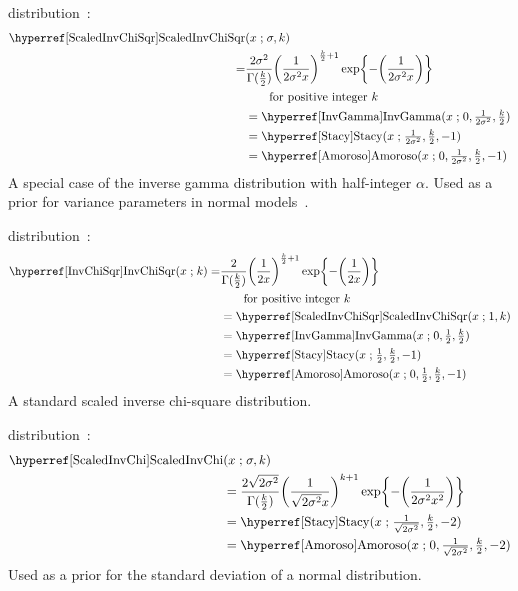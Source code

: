   distribution~\cite{Gelman2004}:
\begin{align}
\label{ScaledInvChiSqr}
\opr{ScaledInvChiSqr}&(x \given \sigma, k) 
\\ \notag =& \frac{2 \sigma^2}{\Gamma(\tfrac{k}{2}) } \Left(\frac{1}{2 \sigma^2x}\Right)^{\frac{k}{2}+1} 
\exp\Left\{-\Left( \frac{1}{2 \sigma^2x}   \Right)\Right\} \checked
\\
&\qquad  \text{for positive integer } k \notag \\
&=  \opr{InvGamma}(x\given 0, \tfrac{1}{2 \sigma^2}, \tfrac{k}{2}) \notag  \checked \\
&= \opr{Stacy}(x\given  \tfrac{1}{2 \sigma ^2},\tfrac{k}{2}, -1)  \notag  \checked \\
&=  \opr{Amoroso}(x\given  0, \tfrac{1}{2 \sigma ^2}, \tfrac{k}{2}, -1) \checked \notag 
\end{align}
A special case of the inverse gamma distribution with half-integer $\alpha$. Used as a prior for variance parameters in normal models~\cite{Gelman2004}.




 distribution~\cite{Gelman2004}: 
%
\begin{align}
\label{InvChiSqr}
\opr{InvChiSqr}(x \given k) 
=& \frac{2}{\Gamma(\tfrac{k}{2}) } \Left(\frac{1}{2x}\Right)^{\frac{k}{2}+1} \exp\Left\{-\Left( \frac{1}{2x}  \Right)\Right\}
\checked  \\
&\qquad  \text{for positive integer } k \notag \\
& = \opr{ScaledInvChiSqr}(x\given 1,k)\notag \checked \\
&=  \opr{InvGamma}(x\given 0, \tfrac{1}{2}, \tfrac{k}{2}) \notag \checked \\
&=  \opr{Stacy}(x\given \tfrac{1}{2}, \tfrac{k}{2},-1) \notag  \checked\\
&=  \opr{Amoroso}(x\given  0, \tfrac{1}{2}, \tfrac{k}{2}, -1)  \checked\notag 
\end{align}
A standard scaled inverse chi-square distribution.



 distribution~\cite{Lee2012}:
\begin{align}
\label{ScaledInvChi}
 \opr{ScaledInvChi}&(x \given \sigma, k) 
\\ \notag
&= \frac{2 \sqrt{2 \sigma ^2} }{ \Gamma(\tfrac{k}{2})} { \Left(\frac{1}{\sqrt{2 \sigma^2} x}\Right)}^{k+1} \exp\Left\{-\Left(\frac{1}{2 \sigma^2 x^2}  \Right)\Right\} \checked
\\
&=  \opr{Stacy}(x\given \tfrac{1}{\sqrt{2 \sigma^2}}, \tfrac{k}{2}, -2)  \notag \checked \\
&=  \opr{Amoroso}(x\given  0, \tfrac{1}{\sqrt{2 \sigma^2}}, \tfrac{k}{2}, -2) \notag  \checked
\end{align}
Used as a prior for the standard deviation of a normal distribution.

